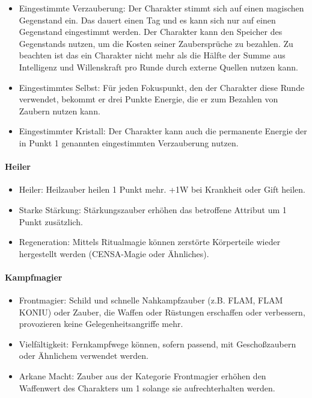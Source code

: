 \documentclass{article}
\begin{document}
\begin{itemize}
\item Eingestimmte Verzauberung: Der Charakter stimmt sich auf einen magischen Gegenstand ein. Das dauert einen Tag und es kann sich nur auf einen Gegenstand eingestimmt werden. Der Charakter kann den Speicher des Gegenstands nutzen, um die Kosten seiner Zaubersprüche zu bezahlen. Zu beachten ist das ein Charakter nicht mehr als die Hälfte der Summe aus Intelligenz und Willenskraft pro Runde durch externe Quellen nutzen kann.
\item Eingestimmtes Selbst: Für jeden Fokuspunkt, den der Charakter diese Runde verwendet, bekommt er drei Punkte Energie, die er zum Bezahlen von Zaubern nutzen kann.
\item Eingestimmter Kristall: Der Charakter kann auch die permanente Energie der in Punkt 1 genannten eingestimmten Verzauberung nutzen.
\end{itemize}

\paragraph{Heiler}

\begin{itemize}
\item Heiler: Heilzauber heilen 1 Punkt mehr. +1W bei Krankheit oder Gift heilen.
\item Starke Stärkung: Stärkungszauber erhöhen das betroffene Attribut um 1 Punkt zusätzlich.
\item Regeneration: Mittels Ritualmagie können zerstörte Körperteile wieder hergestellt werden (CENSA-Magie oder Ähnliches).
\end{itemize}

\paragraph{Kampfmagier}

\begin{itemize}
\item Frontmagier: Schild und schnelle Nahkampfzauber (z.B. FLAM, FLAM KONIU) oder Zauber, die Waffen oder Rüstungen erschaffen oder verbessern, provozieren keine Gelegenheitsangriffe mehr.
\item Vielfältigkeit: Fernkampfwege können, sofern passend, mit Geschoßzaubern oder Ähnlichem verwendet werden.
\item Arkane Macht: Zauber aus der Kategorie Frontmagier erhöhen den Waffenwert des Charakters um 1 solange sie aufrechterhalten werden.
\end{itemize}
\end{document}
